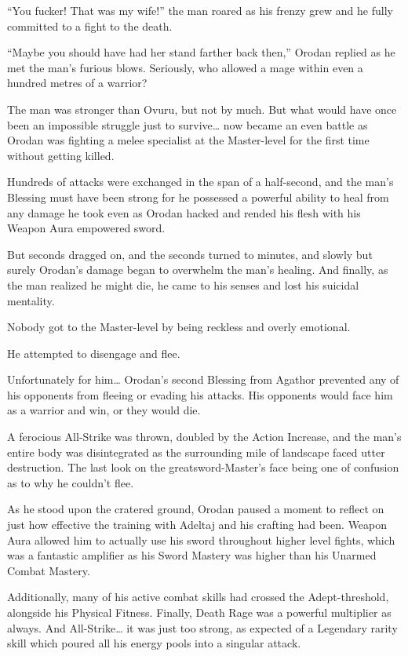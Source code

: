 \documentclass[a4paper,10pt]{book}
\begin{document}
“You fucker! That was my wife!” the man roared as his frenzy grew and he fully committed to a fight to the death.\par
“Maybe you should have had her stand farther back then,” Orodan replied as he met the man’s furious blows. Seriously, who allowed a mage within even a hundred metres of a warrior?\par
The man was stronger than Ovuru, but not by much. But what would have once been an impossible struggle just to survive… now became an even battle as Orodan was fighting a melee specialist at the Master-level for the first time without getting killed.\par
Hundreds of attacks were exchanged in the span of a half-second, and the man’s Blessing must have been strong for he possessed a powerful ability to heal from any damage he took even as Orodan hacked and rended his flesh with his Weapon Aura empowered sword.\par
But seconds dragged on, and the seconds turned to minutes, and slowly but surely Orodan’s damage began to overwhelm the man’s healing. And finally, as the man realized he might die, he came to his senses and lost his suicidal mentality.\par
Nobody got to the Master-level by being reckless and overly emotional.\par
He attempted to disengage and flee.\par
Unfortunately for him… Orodan’s second Blessing from Agathor prevented any of his opponents from fleeing or evading his attacks. His opponents would face him as a warrior and win, or they would die.\par
A ferocious All-Strike was thrown, doubled by the Action Increase, and the man’s entire body was disintegrated as the surrounding mile of landscape faced utter destruction. The last look on the greatsword-Master’s face being one of confusion as to why he couldn’t flee.\par
As he stood upon the cratered ground, Orodan paused a moment to reflect on just how effective the training with Adeltaj and his crafting had been. Weapon Aura allowed him to actually use his sword throughout higher level fights, which was a fantastic amplifier as his Sword Mastery was higher than his Unarmed Combat Mastery.\par
Additionally, many of his active combat skills had crossed the Adept-threshold, alongside his Physical Fitness. Finally, Death Rage was a powerful multiplier as always. And All-Strike… it was just too strong, as expected of a Legendary rarity skill which poured all his energy pools into a singular attack.\par
\end{document}
